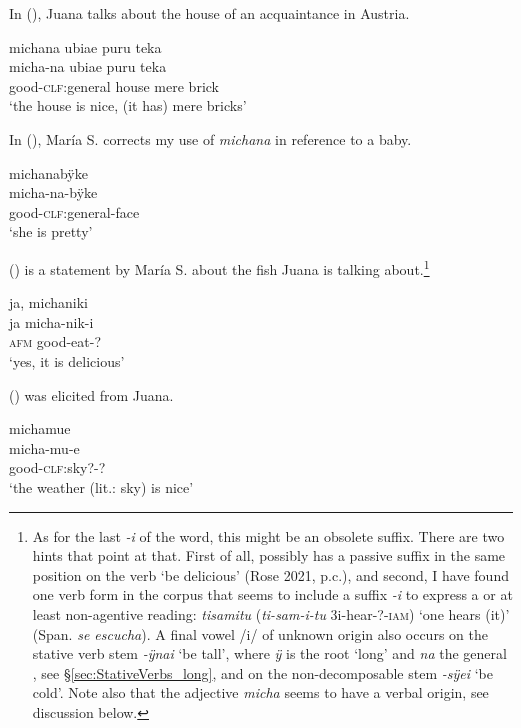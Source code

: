 In (), Juana talks about the house of an acquaintance in Austria.

\ea\label{ex:michana-1}
\begingl
\glpreamble michana ubiae puru teka\\
\gla micha-na ubiae puru teka\\
\glb good-\textsc{clf:}general house mere brick\\
\glft ‘the house is nice, (it has) mere bricks’
\endgl
\trailingcitation{[jxx-p110923l-2.146]}
\xe

In (), María S. corrects my use of \textit{michana} in reference to a baby.

\ea\label{ex:pretty-1}
\begingl
\glpreamble michanabÿke\\
\gla micha-na-bÿke\\
\glb good-\textsc{clf:}general-face\\
\glft ‘she is pretty’
\endgl
\trailingcitation{[rxx-e120511l.327]}
\xe

() is a statement by María S. about the fish Juana is talking about.\footnote{As for the last \textit{-i} of the word, this might be an obsolete  suffix. There are two hints that point at that. First of all,  possibly has a passive suffix in the same position on the verb ‘be delicious’ (Rose 2021, p.c.), and second, I have found one verb form in the corpus that seems to include a suffix \textit{-i} to express a  or at least non-agentive reading: \textit{tisamitu} (\textit{ti-sam-i-tu} 3i-hear-?-\textsc{iam}) ‘one hears (it)’ (Span. \textit{se escucha}). A final vowel /i/ of unknown origin also occurs on the stative verb stem \textit{-ÿnai} ‘be tall’, where \textit{ÿ} is the root ‘long’ and \textit{na} the general , see §\ref{sec:StativeVerbs_long}, and on the non-decomposable stem \textit{-sÿei} ‘be cold’. Note also that the adjective \textit{micha} seems to have a verbal origin, see discussion below.}

\ea\label{ex:ADJ-Pred-2}
\begingl
\glpreamble ja, michaniki\\
\gla ja micha-nik-i\\
\glb \textsc{afm} good-eat-?\\
\glft ‘yes, it is delicious’
\endgl
{}
\xe

() was elicited from Juana.

\ea\label{ex:michamue-1}
\begingl
\glpreamble michamue\\
\gla micha-mu-e\\
\glb good-\textsc{clf:}sky?-?\\
\glft ‘the weather (lit.: sky) is nice’
\endgl
\trailingcitation{[jcx-e090727s.127]}
\xe
{}

